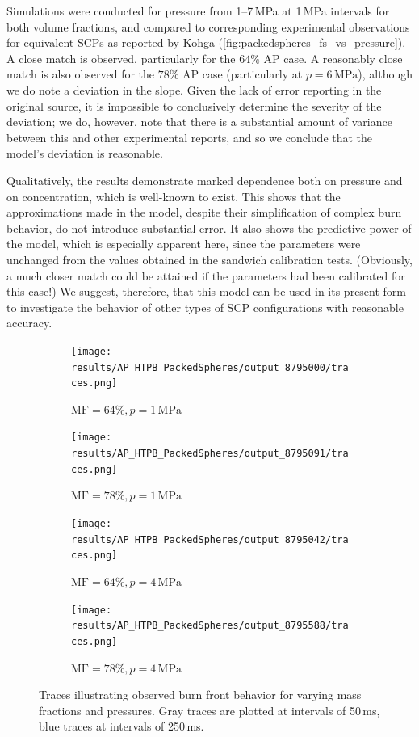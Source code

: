 \documentclass[colorinlistoftodos,review]{elsarticle}
\begin{document}
Simulations were conducted for pressure from 1--7\,MPa at 1\,MPa intervals for both volume fractions, and compared to corresponding experimental observations for equivalent SCPs as reported by Kohga \cite{kohga2011burning} (\cref{fig:packedspheres_fs_vs_pressure}).
A close match is observed, particularly for the $64\%$ AP case.
A reasonably close match is also observed for the $78\%$ AP case (particularly at $p=6\,\mathrm{MPa}$), although we do note a deviation in the slope.
Given the lack of error reporting in the original source, it is impossible to conclusively determine the severity of the deviation; we do, however, note that there is a substantial amount of variance between this and other experimental reports, and so we conclude that the model's deviation is reasonable.

Qualitatively, the results demonstrate marked dependence both on pressure and on concentration, which is well-known to exist.
This shows that the approximations made in the model, despite their simplification of complex burn behavior, do not introduce substantial error.
It also shows the predictive power of the model, which is especially apparent here, since the parameters were unchanged from the values obtained in the sandwich calibration tests.
(Obviously, a much closer match could be attained if the parameters had been calibrated for this case!)
We suggest, therefore, that this model can be used in its present form to investigate the behavior of other types of SCP configurations with reasonable accuracy.


\begin{figure}
  \begin{subfigure}{0.25\linewidth}
    \texttt{[image: results/AP\_HTPB\_PackedSpheres/output\_8795000/traces.png]}%
    \caption{$\mathrm{MF}=64\%,p=1\,\mathrm{MPa}$}\label{fig:Packed_low_low}
  \end{subfigure}%
  \begin{subfigure}{0.25\linewidth}
    \texttt{[image: results/AP\_HTPB\_PackedSpheres/output\_8795091/traces.png]}%
    \caption{$\mathrm{MF}=78\%,p=1\,\mathrm{MPa}$}\label{fig:Packed_high_low}
  \end{subfigure}%
  \begin{subfigure}{0.25\linewidth}
    \texttt{[image: results/AP\_HTPB\_PackedSpheres/output\_8795042/traces.png]}%
    \caption{$\mathrm{MF}=64\%,p=4\,\mathrm{MPa}$}\label{fig:Packed_low_high}
  \end{subfigure}%
  \begin{subfigure}{0.25\linewidth}
    \texttt{[image: results/AP\_HTPB\_PackedSpheres/output\_8795588/traces.png]}%
    \caption{$\mathrm{MF}=78\%,p=4\,\mathrm{MPa}$}\label{fig:Packed_high_high}
  \end{subfigure}
  \caption{
    Traces illustrating observed burn front behavior for varying mass fractions and pressures.
    Gray traces are plotted at intervals of 50\,ms, blue traces at intervals of 250\,ms.
  }
  \label{fig:packedspheres_traces}
\end{figure}
\end{document}
